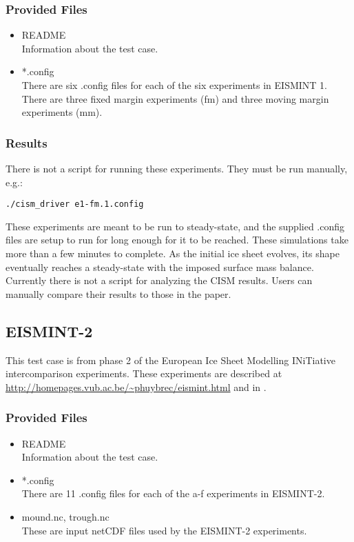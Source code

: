 \subsubsection{Provided Files}
\label{subsec:eismint_files}

\begin{itemize}
	\item README \\
		Information about the test case.
\item *.config \\
  There are six .config files for each of the six experiments in EISMINT 1.  There are three fixed margin experiments (fm) and three moving margin experiments (mm).
\end{itemize}


\subsubsection{Results}
\label{subsecc:eismint_results}
There is not a script for running these experiments.  They must be run manually, e.g.: 

\texttt{./cism\_driver e1-fm.1.config}

These experiments are meant to be run to steady-state, and the supplied .config files are setup to run for long enough for it to be reached.
These simulations take more than a few minutes to complete.
As the initial ice sheet evolves, its shape eventually reaches a steady-state with the imposed surface mass balance.  Currently there is not a script for analyzing the CISM results.  Users can manually compare their results to those in the \citet{Huybrechts1996} paper.


\subsection{EISMINT-2}
\label{sec:eismint2_description}
This test case is from phase 2 of the European Ice Sheet Modelling INiTiative intercomparison experiments.  These experiments are described at \url{http://homepages.vub.ac.be/~phuybrec/eismint.html} and in \citet{Payne2000}.

\subsubsection{Provided Files}
\label{subsec:eismint2_files}

\begin{itemize}
	\item README \\
		Information about the test case.
  \item *.config \\
  There are 11 .config files for each of the a-f experiments in EISMINT-2.
  \item mound.nc, trough.nc \\
    These are input netCDF files used by the EISMINT-2 experiments.
\end{itemize}


